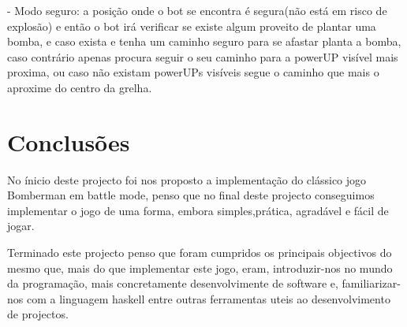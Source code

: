 \documentclass[a4paper]{article}
\begin{document}
- Modo seguro: a posição onde o bot se encontra é segura(não está em risco de explosão) e então o bot irá verificar se existe algum proveito de plantar uma bomba, e caso exista e tenha um caminho seguro para se afastar planta a bomba, caso contrário apenas procura seguir o seu caminho para a powerUP visível mais proxima, ou caso não existam powerUPs visíveis segue o caminho que mais o aproxime do centro da grelha.


\pagebreak
\section{Conclusões}
\label{sec:conclusao}

No ínicio deste projecto foi nos proposto a implementação do clássico jogo Bomberman em battle mode, penso que no final deste projecto conseguimos
 implementar o jogo de uma forma, embora simples,prática, agradável e fácil de jogar.

Terminado este projecto penso que foram cumpridos os principais objectivos do mesmo que, mais do que implementar este jogo, eram,
introduzir-nos no mundo da programação, mais concretamente desenvolvimente de software e, familiarizar-nos com a linguagem haskell entre outras ferramentas uteis ao desenvolvimento de projectos.
\end{document}
